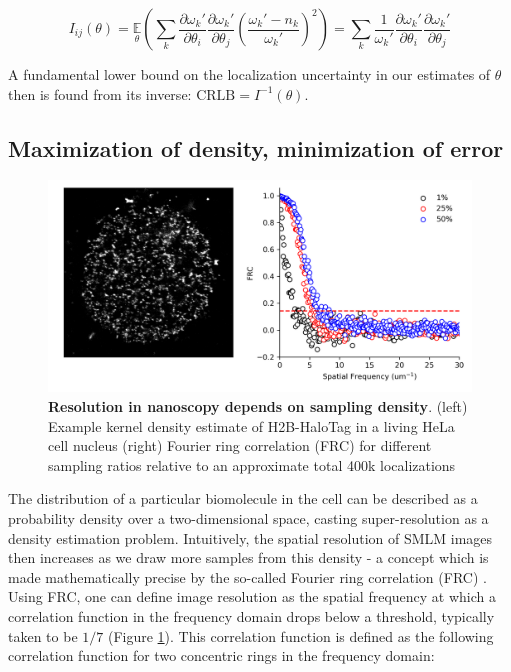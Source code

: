 \begin{equation*}
I_{ij}(\theta) = \underset{\theta}{\mathbb{E}}\left(\sum_{k}\frac{\partial \omega_{k}'}{\partial\theta_{i}}\frac{\partial \omega_{k}'}{\partial\theta_{j}} \left(\frac{\omega_{k}'-n_{k}}{\omega_{k}'}\right)^{2}\right) = \sum_{k}\frac{1}{\omega_{k}'}\frac{\partial \omega_{k}'}{\partial\theta_{i}}\frac{\partial \omega_{k}'}{\partial\theta_{j}}
\end{equation*}

A fundamental lower bound on the localization uncertainty in our estimates of $\theta$ then is found from its inverse: $\mathrm{CRLB} = I^{-1}(\theta)$.

\subsection{Maximization of density, minimization of error}

\begin{figure}[t]
\begin{center}
\includegraphics[width=14cm]{media/FRC.png}
\end{center}
\caption{\textbf{Resolution in nanoscopy depends on sampling density}. (left) Example kernel density estimate of H2B-HaloTag in a living HeLa cell nucleus (right) Fourier ring correlation (FRC) for different sampling ratios relative to an approximate total 400k localizations}
\label{fig:fig3}
\end{figure}

The distribution of a particular biomolecule in the cell can be described as a probability density over a two-dimensional space, casting super-resolution as a density estimation problem. Intuitively, the spatial resolution of SMLM images then increases as we draw more samples from this density - a concept which is made mathematically precise by the so-called Fourier ring correlation (FRC) \parencite{Nieuwenhuizen2013}. Using FRC, one can define image resolution as the spatial frequency at which a correlation function in the frequency domain drops below a threshold, typically taken to be $1/7$  (Figure \ref{fig:fig3}). This correlation function is defined as the following correlation function for two concentric rings in the frequency domain:


